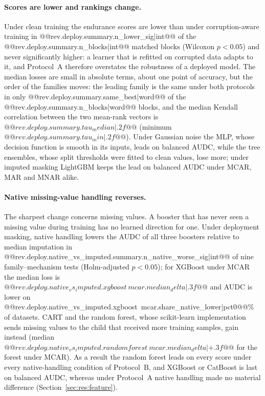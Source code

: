 \documentclass[pdflatex,sn-mathphys]{sn-jnl}
\theoremstyle{thmstyleone}
\theoremstyle{thmstyletwo}
\theoremstyle{thmstylethree}
\begin{document}
\paragraph{Scores are lower and rankings change.} Under clean training the endurance scores are lower than under corruption-aware training in @@{rev.deploy.summary.n_lower_sig|int}@@ of the @@{rev.deploy.summary.n_blocks|int}@@ matched blocks (Wilcoxon $p<0.05$) and never significantly higher: a learner that is refitted on corrupted data adapts to it, and Protocol~A therefore overstates the robustness of a deployed model. The median losses are small in absolute terms, about one point of accuracy, but the order of the families moves: the leading family is the same under both protocols in only @@{rev.deploy.summary.same_best|word}@@ of the @@{rev.deploy.summary.n_blocks|word}@@ blocks, and the median Kendall correlation between the two mean-rank vectors is $@@{rev.deploy.summary.tau_median|.2f}@@$ (minimum $@@{rev.deploy.summary.tau_min|.2f}@@$). Under Gaussian noise the MLP, whose decision function is smooth in its inputs, leads on balanced AUDC, while the tree ensembles, whose split thresholds were fitted to clean values, lose more; under imputed masking LightGBM keeps the lead on balanced AUDC under MCAR, MAR and MNAR alike.

\paragraph{Native missing-value handling reverses.} The sharpest change concerns missing values. A booster that has never seen a missing value during training has no learned direction for one. Under deployment masking, native handling lowers the AUDC of all three boosters relative to median imputation in @@{rev.deploy.native_vs_imputed.summary.n_native_worse_sig|int}@@ of nine family--mechanism tests (Holm-adjusted $p<0.05$); for XGBoost under MCAR the median loss is $@@{rev.deploy.native_vs_imputed.xgboost~mcar.median_delta|.3f}@@$ and AUDC is lower on @@{rev.deploy.native_vs_imputed.xgboost~mcar.share_native_lower|pct0}@@\% of datasets. CART and the random forest, whose scikit-learn implementation sends missing values to the child that received more training samples, gain instead (median $@@{rev.deploy.native_vs_imputed.randomforest~mcar.median_delta|+.3f}@@$ for the forest under MCAR). As a result the random forest leads on every score under every native-handling condition of Protocol~B, and XGBoost or CatBoost is last on balanced AUDC, whereas under Protocol~A native handling made no material difference (Section~\ref{sec:res:feature}).
\end{document}
